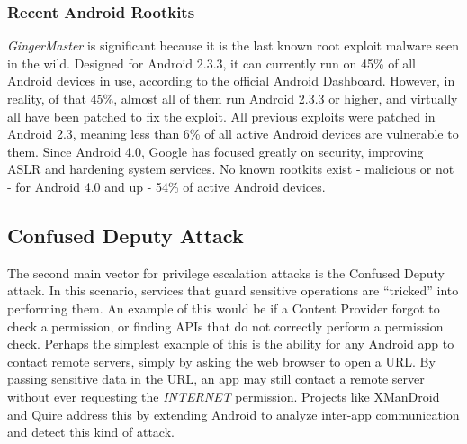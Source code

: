 \subsubsection{Recent Android Rootkits}
\label{sec:recentrootkits}
\textit{GingerMaster}\citep{cskills2011} is significant because it is the last known root exploit malware seen in the wild. Designed for Android 2.3.3, it can currently run on 45\% of all Android devices in use, according to the official Android Dashboard\citep{androiddashboard}. However, in reality, of that 45\%, almost all of them run Android 2.3.3 or higher, and virtually all have been patched to fix the exploit\citep{cskills2011}. All previous exploits were patched in Android 2.3\citep{cskills2011}, meaning less than 6\% of all active Android devices are vulnerable to them. Since Android 4.0, Google has focused greatly on security, improving ASLR\citep{threatpost2012} and hardening system services\citep{androidjbsecurity}. No known rootkits exist - malicious or not - for Android 4.0 and up - 54\% of active Android devices.


\subsection{Confused Deputy Attack}
The second main vector for privilege escalation attacks is the Confused Deputy attack\citep{hardy1988confused}. In this scenario, services that guard sensitive operations are ``tricked'' into performing them. An example of this would be if a Content Provider forgot to check a permission, or finding APIs that do not correctly perform a permission check. Perhaps the simplest example of this is the ability for any Android app to contact remote servers, simply by asking the web browser to open a URL. By passing sensitive data in the URL, an app may still contact a remote server without ever requesting the \textit{INTERNET} permission. Projects like XManDroid\citep{bugiel2011xmandroid} and Quire\citep{dietz2011quire} address this by extending Android to analyze inter-app communication and detect this kind of attack. %


